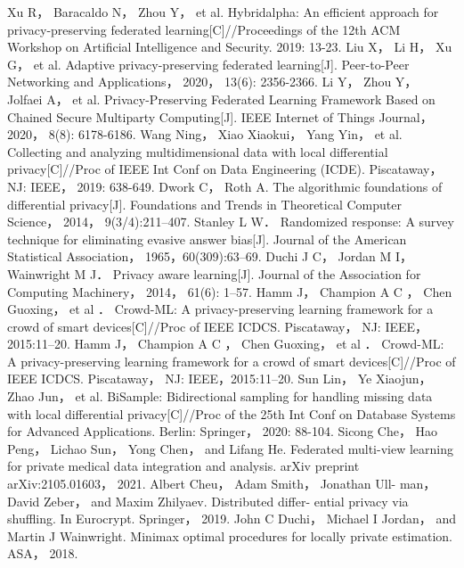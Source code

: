 \documentclass[12pt,openany,a4paper,fancyhdr,oneside]{ctexbook}
\begin{document}
\begin{thebibliography}{99}
Xu R， Baracaldo N， Zhou Y， et al. Hybridalpha: An efficient approach for privacy-preserving federated learning[C]//Proceedings of the 12th ACM Workshop on Artificial Intelligence and Security. 2019: 13-23.
Liu X， Li H， Xu G， et al. Adaptive privacy-preserving federated learning[J]. Peer-to-Peer Networking and Applications， 2020， 13(6): 2356-2366.
Li Y， Zhou Y， Jolfaei A， et al. Privacy-Preserving Federated Learning Framework Based on Chained Secure Multiparty Computing[J]. IEEE Internet of Things Journal， 2020， 8(8): 6178-6186.
Wang  Ning，  Xiao  Xiaokui，  Yang  Yin，  et  al.  Collecting  and  analyzing 
multidimensional data with local differential privacy[C]//Proc of IEEE Int 
Conf on Data Engineering (ICDE). Piscataway， NJ: IEEE， 2019: 638-649.
 Dwork  C，  Roth  A.  The  algorithmic  foundations  of  differential  privacy[J]. 
Foundations  and  Trends  in  Theoretical  Computer  Science，  2014， 
9(3/4):211–407.
 Stanley L W．  Randomized response: A survey technique for eliminating 
evasive  answer  bias[J].  Journal  of  the  American  Statistical  Association， 
1965，60(309):63–69.
Duchi  J  C，  Jordan  M  I，  Wainwright  M  J．  Privacy  aware  learning[J]. 
Journal of the Association for Computing Machinery， 2014， 61(6): 1–57.
Hamm  J，  Champion  A  C  ，  Chen  Guoxing，  et  al ．   Crowd-ML:  A 
privacy-preserving  learning  framework  for  a  crowd  of  smart 
devices[C]//Proc of IEEE ICDCS. Piscataway， NJ: IEEE，2015:11–20.
  Hamm  J，  Champion  A  C  ，  Chen  Guoxing，  et  al ．   Crowd-ML:  A 
privacy-preserving  learning  framework  for  a  crowd  of  smart 
devices[C]//Proc of IEEE ICDCS. Piscataway， NJ: IEEE，2015:11–20.
 Sun Lin， Ye Xiaojun， Zhao Jun， et al. BiSample: Bidirectional sampling for 
handling  missing  data  with  local  differential  privacy[C]//Proc  of  the  25th 
Int Conf on Database Systems for Advanced Applications. Berlin: Springer， 
2020: 88-104.
Sicong Che， Hao Peng， Lichao Sun， Yong Chen， and Lifang He. Federated multi-view learning for private medical data integration and analysis. arXiv preprint arXiv:2105.01603， 2021.
Albert Cheu， Adam Smith， Jonathan Ull- man， David Zeber， and Maxim Zhilyaev. Distributed differ- ential privacy via shuffling. In Eurocrypt. Springer， 2019.
John C Duchi， Michael I Jordan， and Martin J Wainwright. Minimax optimal procedures for locally private estimation. ASA， 2018.

\end{thebibliography}
\end{document}
